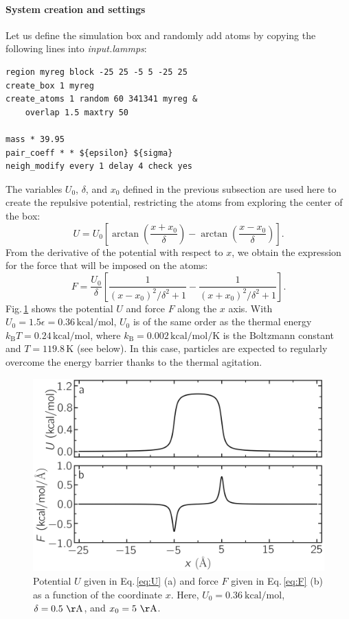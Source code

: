 \documentclass[9pt,tutorial]{livecoms}
\begin{document}
\paragraph{System creation and settings}
\noindent Let us define the simulation box and randomly add atoms by copying the following lines into \textit{input.lammps}:
{\normalsize \begin{verbatim}
region myreg block -25 25 -5 5 -25 25
create_box 1 myreg
create_atoms 1 random 60 341341 myreg &
    overlap 1.5 maxtry 50

mass * 39.95
pair_coeff * * ${epsilon} ${sigma}
neigh_modify every 1 delay 4 check yes
\end{verbatim}}
The variables $U_0$, $\delta$, and $x_0$ defined in the previous subsection are used here to create the repulsive potential, restricting the atoms from exploring the center of the box: 
\begin{equation}
U = U_0 \left[ \arctan \left( \dfrac{x+x_0}{\delta} \right) - \arctan \left(\dfrac{x-x_0}{\delta} \right) \right].
\label{eq:U}
\end{equation}
From the derivative of the potential with respect to $x$, we obtain the expression
for the force that will be imposed on the atoms:
\begin{equation}
F= \dfrac{U_0}{\delta} \left[ \dfrac{1}{(x-x_0)^2/\delta^2+1} - \dfrac{1}{(x+x_0)^2/\delta^2+1} \right].
\label{eq:F}
\end{equation}
Fig.\,\ref{fig:potential} shows the potential $U$ and force $F$ along the $x$ axis. With $U_0 = 1.5 \epsilon = 0.36\,\text{kcal/mol}$, $U_0$ is of the same order as the thermal energy $k_\text{B} T = 0.24\,\text{kcal/mol}$, where $k_\text{B} = 0.002\,\text{kcal/mol/K}$ is the Boltzmann constant and $T = 119.8\,\text{K}$ (see below). In this case, particles are expected to regularly overcome the energy barrier thanks to the thermal agitation.

\begin{figure}
\centering
\includegraphics[width=\linewidth]{US-potential}
\caption{Potential $U$ given in Eq.\,\eqref{eq:U} (a) and force $F$ given in Eq.\,\eqref{eq:F} (b) as a function of the coordinate $x$. Here, $U_0 = 0.36~\text{kcal/mol}$, $\delta = 0.5~\mathrm{\AA{}}$, and $x_0 = 5~\mathrm{\AA{}}$.}
\label{fig:potential}
\end{figure}
\end{document}

